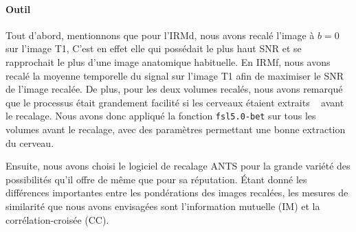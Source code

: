 \documentclass[a4paper]{article}
\begin{document}
\paragraph{Outil}
Tout d'abord, mentionnons que pour l'IRMd, nous avons recalé l'image à $b=0$ sur l'image T1, C'est en effet elle qui possédait le plus haut SNR et se rapprochait le plus d'une image anatomique habituelle. En IRMf, nous avons recalé la moyenne temporelle du signal sur l'image T1 afin de maximiser le SNR de l'image recalée. De plus, pour les deux volumes recalés, nous avons remarqué que le processus était grandement facilité si les cerveaux étaient \og extraits \fg~ avant le recalage. Nous avons donc appliqué la fonction \lstinline{fsl5.0-bet} sur tous les volumes avant le recalage, avec des paramètres permettant une bonne extraction du cerveau.

Ensuite, nous avons choisi le logiciel de recalage ANTS pour la grande variété des possibilités qu'il offre de même que pour sa réputation. Étant donné les différences importantes entre les pondérations des images recalées, les mesures de similarité que nous avons envisagées sont l'information mutuelle (IM) et la corrélation-croisée (CC). 
\end{document}
